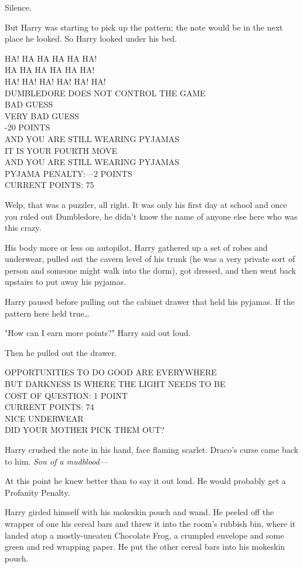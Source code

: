 Silence.

But Harry was starting to pick up the pattern; the note would be in the next 
place he looked. So Harry looked under his bed.

HA! HA HA HA HA HA!\\
HA HA HA HA HA HA!\\
HA! HA! HA! HA! HA! HA!\\
DUMBLEDORE DOES NOT CONTROL THE GAME\\
BAD GUESS\\
VERY BAD GUESS\\
-20 POINTS\\
AND YOU ARE STILL WEARING PYJAMAS\\
IT IS YOUR FOURTH MOVE\\
AND YOU ARE STILL WEARING PYJAMAS\\
PYJAMA PENALTY:---2 POINTS\\
CURRENT POINTS: 75

Welp, that was a puzzler, all right. It was only his first day at school and 
once you ruled out Dumbledore, he didn't know the name of anyone else here who 
was this crazy.

His body more or less on autopilot, Harry gathered up a set of robes and 
underwear, pulled out the cavern level of his trunk (he was a very private sort 
of person and someone might walk into the dorm), got dressed, and then went 
back upstairs to put away his pyjamas.

Harry paused before pulling out the cabinet drawer that held his pyjamas. If 
the pattern here held true{\ldots}

"How can I earn more points?" Harry said out loud.

Then he pulled out the drawer.

OPPORTUNITIES TO DO GOOD ARE EVERYWHERE\\
BUT DARKNESS IS WHERE THE LIGHT NEEDS TO BE\\
COST OF QUESTION: 1 POINT\\
CURRENT POINTS: 74\\
NICE UNDERWEAR\\
DID YOUR MOTHER PICK THEM OUT?

Harry crushed the note in his hand, face flaming scarlet. Draco's curse came 
back to him. \emph{Son of a mudblood---}

At this point he knew better than to say it out loud. He would probably get a 
Profanity Penalty.

Harry girded himself with his mokeskin pouch and wand. He peeled off the 
wrapper of one his cereal bars and threw it into the room's rubbish bin, where 
it landed atop a mostly-uneaten Chocolate Frog, a crumpled envelope and some 
green and red wrapping paper. He put the other cereal bars into his mokeskin 
pouch.

